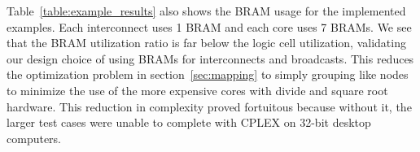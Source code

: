 Table~\ref{table:example_results} also shows the BRAM usage for the implemented examples. 
Each interconnect uses 1 BRAM and each core uses 7 BRAMs. 
We see that the BRAM utilization ratio is far below the logic cell utilization, validating our design choice of using BRAMs for interconnects and broadcasts.     
This reduces the optimization problem in section~\ref{sec:mapping} to simply grouping like nodes to minimize the use of the more expensive cores with divide and square root hardware.
This reduction in complexity proved fortuitous because without it, the larger test cases were unable to complete with CPLEX on 32-bit desktop computers.


